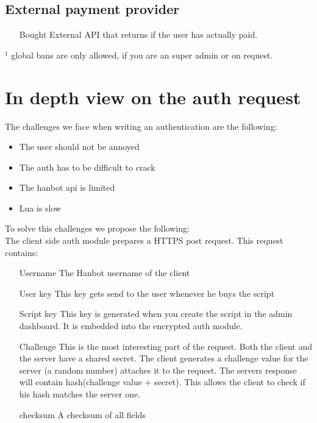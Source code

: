 \documentclass{article}
\begin{document}
\subsection{External payment provider}
\begin{itemize}
	\item[Bought] External API that returns if the user has actually paid.
\end{itemize}
$^1$ global bans are only allowed, if you are an super admin or on request.

\section{In depth view on the auth request}
The challenges we face when writing an authentication are the following:
\begin{itemize}
	\item The user should not be annoyed
	\item The auth has to be difficult to crack
	\item The hanbot api is limited
	\item Lua is slow
\end{itemize}
To solve this challenges we propose the following:\\
The client side auth module prepares a HTTPS post request.
This request contains:
\begin{itemize}
	\item[Username] The Hanbot username of the client
	\item[User key] This key gets send to the user whenever he buys the script
	\item[Script key] This key is generated when you create the script in the admin dashboard. It is embedded into the encrypted auth module.
	\item[Challenge] This is the most interesting part of the request. Both the client and the server have a shared secret. The client generates a challenge value for the server (a random number) attaches it to the request. The servers response will contain hash(challenge value + secret). This allows the client to check if his hash matches the server one.
	\item[checksum] A checksum of all fields
\end{itemize}
\end{document}

